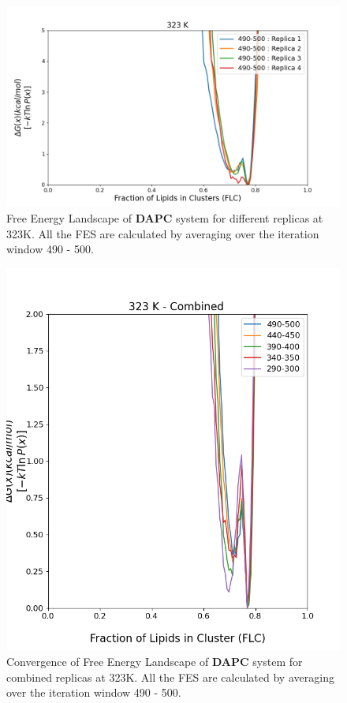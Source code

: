 \documentclass{biophys-new}
\begin{document}

\begin{figure}[hbt!]
\centering
\includegraphics[width=1.1\linewidth]{all_plots/ClusterLipids2Total/DPPC_DAPC_CHOL/323K/Average_DAPC_323_ClusterLipids2Total.png}
\caption{Free Energy Landscape of \textbf{DAPC} system for different replicas at 323K. All the FES are calculated by averaging over the iteration window 490 - 500.}
\label{fig:view}

\end{figure}

\begin{figure}[hbt!]
\centering
\includegraphics[width=0.6\linewidth]{all_plots/ClusterLipids2Total/DPPC_DAPC_CHOL/323K/Convergence_DAPC_MULTI__323_ClusterLipids2Total.png}
\caption{Convergence of Free Energy Landscape of \textbf{DAPC} system for combined replicas at 323K. All the FES are calculated by averaging over the iteration window 490 - 500.}
\label{fig:view}

\end{figure}
\end{document}
